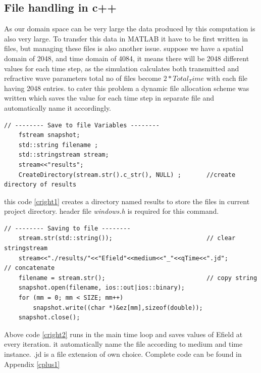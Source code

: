 \subsection{File handling in c++}
As our domain space can be very large the data produced by this computation is also very large. To transfer this data in MATLAB it have to be first written in files, but managing these files is also another issue. suppose we have a spatial domain of 2048, and time domain of 4084, it means there will be 2048 different values for each time step, as the simulation calculates both transmitted and refractive wave parameters total no of files become $2*Total_Time$ with each file having 2048 entries.
to cater this problem a dynamic file allocation scheme was written which saves the value for each time step in separate file and automatically name it accordingly.
\begin{lstlisting}
// -------- Save to file Variables -------- 
	fstream snapshot;
	std::string filename ;
	std::stringstream stream;
	stream<<"results";
	CreateDirectory(stream.str().c_str(), NULL) ;		//create directory of results
\end{lstlisting}
this code \ref{cright1} creates a directory named results to store the files in current project directory. header file \emph{windows.h} is required for this command.
\begin{lstlisting}
// -------- Saving to file -------- 
	stream.str(std::string());   						// clear stringstream
	stream<<"./results/"<<"Efield"<<medium<<"_"<<qTime<<".jd";   		// concatenate
	filename = stream.str();		 					// copy string
	snapshot.open(filename, ios::out|ios::binary);
	for (mm = 0; mm < SIZE; mm++)
		snapshot.write((char *)&ez[mm],sizeof(double));
	snapshot.close();
\end{lstlisting}
Above code \ref{cright2} runs in the main time loop and saves values of Efield at every iteration. it automatically name the file according to medium and time instance. .jd is a file extension of own choice. Complete code can be found in Appendix \ref{cplus1}

